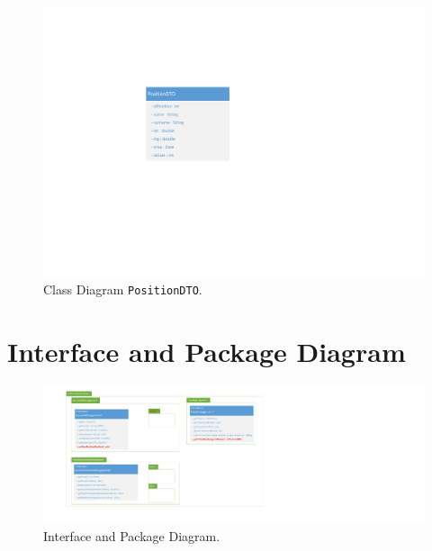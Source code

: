 \begin{figure}[h!]
	\centering
	\includegraphics[width=1\linewidth]{./Iterazione 4/OtherFiles/DTOSpecification}
	\caption{Class Diagram \texttt{PositionDTO}.}
	\label{fig:ClassDiagramDTO_iterazione4}
\end{figure}

\clearpage

\section{Interface and Package Diagram}

\begin{figure}[h!]
	\centering
	\includegraphics[width=0.8\linewidth]{./Iterazione 4/OtherFiles/UML - Interface Diagram}
	\caption{Interface and Package Diagram.}
\label{fig:InterfaceDiagram_iterazione3}
\end{figure}